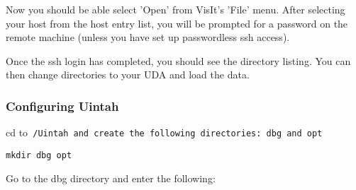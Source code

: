 Now you should be able select 'Open' from VisIt's 'File' menu. After selecting your host from the host entry list, you will be prompted for a password on the remote machine (unless you have set up passwordless ssh access). 

Once the ssh login has completed, you should see the directory listing. You can then change directories to your UDA and load the data. 















\subsubsection{Configuring Uintah}

cd to\tt ~/Uintah \normalfont and create the following directories:
dbg and opt

\begin{verbatim}
mkdir dbg opt
\end{verbatim}

Go to the dbg directory and enter the following:

